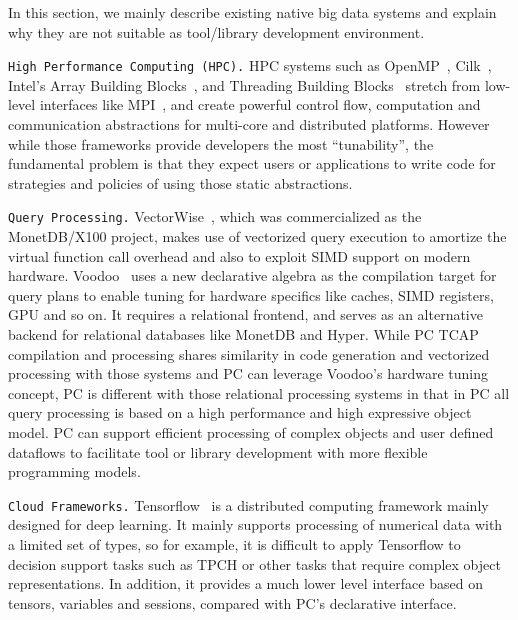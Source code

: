 In this section, we mainly describe existing native big
data systems and explain why they are not suitable as tool/library
development environment.

\vspace{5pt} 
\texttt{High Performance Computing (HPC).} HPC
systems such as OpenMP~\cite{dagum1998openmp}, Cilk~\cite{blumofe1996cilk},  Intel's Array Building
Blocks~\cite{newburn2011intel}, and Threading Building Blocks~\cite{reinders2007intel} stretch from
low-level interfaces like MPI~\cite{gropp1996high}, and create powerful control flow, computation
and communication abstractions for multi-core and distributed
platforms. However while those frameworks provide developers the most
``tunability'', the fundamental problem is that they expect users
or applications to write code for strategies and policies of using
those static abstractions. 

\vspace{5pt} 
\texttt{Query Processing.} VectorWise~\cite{zukowski2012vectorwise}, which was commercialized as the MonetDB/X100 project, makes use of
vectorized query execution to amortize the virtual function call overhead and also to exploit SIMD support
on modern hardware. Voodoo~\cite{pirk2016voodoo} uses a new
declarative algebra as the compilation target for query plans to
enable tuning for hardware specifics like caches, SIMD registers,
GPU and so on. It requires a relational frontend, and serves as an alternative backend for
relational databases like MonetDB and Hyper. While PC TCAP compilation
and processing shares
similarity in
code generation and vectorized processing with those
systems and PC can leverage Voodoo's hardware tuning concept, PC is
different with those relational processing systems in that in PC all query processing
is based on a high performance and high expressive object model.
PC can support efficient
processing of complex objects and user defined
dataflows to facilitate tool or library development with more flexible
programming models.

\vspace{5pt} 
\texttt{Cloud Frameworks.} Tensorflow~\cite{abadi2016tensorflow} is a
distributed computing framework mainly designed for deep learning. It
mainly supports processing of numerical data with a
limited set of types, so for example,  it is
difficult to apply Tensorflow to decision support tasks such as
TPCH or other tasks that require complex object representations. In
addition, it provides a much lower level interface based on tensors,
variables and sessions, compared with PC's
declarative interface. 



